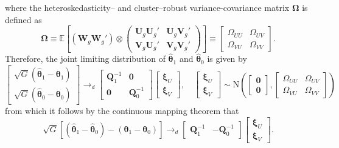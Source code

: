 where the heteroskedasticity-- and cluster--robust variance-covariance matrix $\boldsymbol{\Omega}$ is defined as
\[
\boldsymbol{\Omega} \equiv 
 \mathbb{E} \left[\left(\mathbf{W}_g \mathbf{W}_g' \right)\otimes \begin{pmatrix}
\mathbf{U}_g \mathbf{U}_g' & \mathbf{U}_g \mathbf{V}_g' \\
\mathbf{V}_g \mathbf{U}_g' & \mathbf{V}_g \mathbf{V}_g'  
\end{pmatrix} \right] \equiv \begin{bmatrix}
\Omega_{UU} & \Omega_{UV} \\
\Omega_{VU} & \Omega_{VV}
\end{bmatrix}.
\]
Therefore, the joint limiting distribution of $\widehat{\boldsymbol{\theta}}_1$ and $\widehat{\boldsymbol{\theta}}_0$ is given by
\[
\begin{bmatrix}
\sqrt{G}(\widehat{\boldsymbol{\theta}}_1 - \boldsymbol{\theta}_1)\\
\sqrt{G}(\widehat{\boldsymbol{\theta}}_0 - \boldsymbol{\theta}_0)
\end{bmatrix} \rightarrow_d
\begin{bmatrix}
\mathbf{Q}_1^{-1} & \mathbf{0} \\
\mathbf{0} & \mathbf{Q}_0^{-1} 
\end{bmatrix}
\begin{bmatrix}
\boldsymbol{\xi}_U \\ \boldsymbol{\xi}_V 
\end{bmatrix}, \quad
\begin{bmatrix}
\boldsymbol{\xi}_U \\ \boldsymbol{\xi}_V 
\end{bmatrix} \sim \text{N}\left(\begin{bmatrix} \mathbf{0} \\ \mathbf{0}\end{bmatrix},
\begin{bmatrix}
\Omega_{UU} & \Omega_{UV} \\
\Omega_{VU} & \Omega_{VV}
\end{bmatrix}\right)
\]
from which it follows by the continuous mapping theorem that
\[
\sqrt{G}\left[ (\widehat{\boldsymbol{\theta}}_1 - \widehat{\boldsymbol{\theta}}_0 ) - (\boldsymbol{\theta}_1 - \boldsymbol{\theta}_0)\right] 
\rightarrow_d
\begin{bmatrix}
\mathbf{Q}_1^{-1} & -\mathbf{Q}_0^{-1}
\end{bmatrix}
\begin{bmatrix}
\boldsymbol{\xi}_U \\ \boldsymbol{\xi}_V 
\end{bmatrix}.
\]
